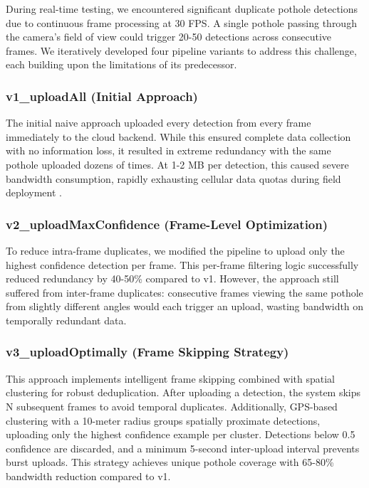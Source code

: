 \documentclass{ieeeaccess}
\begin{document}
During real-time testing, we encountered significant duplicate pothole detections due to continuous frame processing at 30 FPS. A single pothole passing through the camera's field of view could trigger 20-50 detections across consecutive frames. We iteratively developed four pipeline variants to address this challenge, each building upon the limitations of its predecessor.

\subsubsection{v1\_uploadAll (Initial Approach)}
The initial naive approach uploaded every detection from every frame immediately to the cloud backend. While this ensured complete data collection with no information loss, it resulted in extreme redundancy with the same pothole uploaded dozens of times. At 1-2 MB per detection, this caused severe bandwidth consumption, rapidly exhausting cellular data quotas during field deployment \cite{b16}.

\subsubsection{v2\_uploadMaxConfidence (Frame-Level Optimization)}
To reduce intra-frame duplicates, we modified the pipeline to upload only the highest confidence detection per frame. This per-frame filtering logic successfully reduced redundancy by 40-50\% compared to v1. However, the approach still suffered from inter-frame duplicates: consecutive frames viewing the same pothole from slightly different angles would each trigger an upload, wasting bandwidth on temporally redundant data.

\subsubsection{v3\_uploadOptimally (Frame Skipping Strategy)}
This approach implements intelligent frame skipping combined with spatial clustering for robust deduplication. After uploading a detection, the system skips N subsequent frames to avoid temporal duplicates. Additionally, GPS-based clustering with a 10-meter radius groups spatially proximate detections, uploading only the highest confidence example per cluster. Detections below 0.5 confidence are discarded, and a minimum 5-second inter-upload interval prevents burst uploads. This strategy achieves unique pothole coverage with 65-80\% bandwidth reduction compared to v1.
\end{document}

